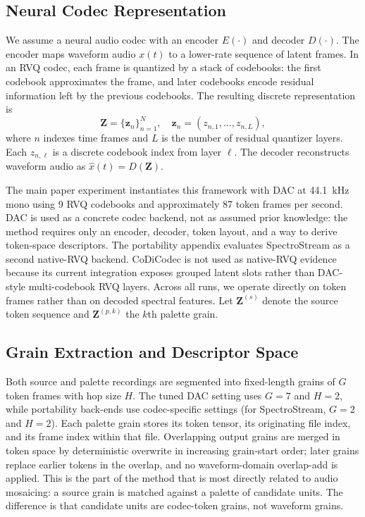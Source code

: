 \documentclass[twoside,a4paper]{article}
\begin{document}
\subsection{Neural Codec Representation}

We assume a neural audio codec with an encoder $E(\cdot)$ and decoder $D(\cdot)$. The encoder maps waveform audio $x(t)$ to a lower-rate sequence of latent frames. In an RVQ codec, each frame is quantized by a stack of codebooks: the first codebook approximates the frame, and later codebooks encode residual information left by the previous codebooks. The resulting discrete representation is
\begin{equation}
    \mathbf{Z} = \{ \mathbf{z}_n \}_{n=1}^{N}, \quad \mathbf{z}_n = (z_{n,1}, \dots, z_{n,L}),
\end{equation}
where $n$ indexes time frames and $L$ is the number of residual quantizer layers. Each $z_{n,\ell}$ is a discrete codebook index from layer $\ell$. The decoder reconstructs waveform audio as $\hat{x}(t) = D(\mathbf{Z})$.

The main paper experiment instantiates this framework with DAC at 44.1~kHz mono using 9 RVQ codebooks and approximately 87 token frames per second. DAC is used as a concrete codec backend, not as assumed prior knowledge: the method requires only an encoder, decoder, token layout, and a way to derive token-space descriptors. The portability appendix evaluates SpectroStream as a second native-RVQ backend. CoDiCodec is not used as native-RVQ evidence because its current integration exposes grouped latent slots rather than DAC-style multi-codebook RVQ layers. Across all runs, we operate directly on token frames rather than on decoded spectral features. Let $\mathbf{Z}^{(s)}$ denote the source token sequence and $\mathbf{Z}^{(p,k)}$ the $k$th palette grain.

\subsection{Grain Extraction and Descriptor Space}

Both source and palette recordings are segmented into fixed-length grains of $G$ token frames with hop size $H$. The tuned DAC setting uses $G=7$ and $H=2$, while portability back-ends use codec-specific settings (for SpectroStream, $G=2$ and $H=2$). Each palette grain stores its token tensor, its originating file index, and its frame index within that file. Overlapping output grains are merged in token space by deterministic overwrite in increasing grain-start order; later grains replace earlier tokens in the overlap, and no waveform-domain overlap-add is applied. This is the part of the method that is most directly related to audio mosaicing: a source grain is matched against a palette of candidate units. The difference is that candidate units are codec-token grains, not waveform grains.
\end{document}
